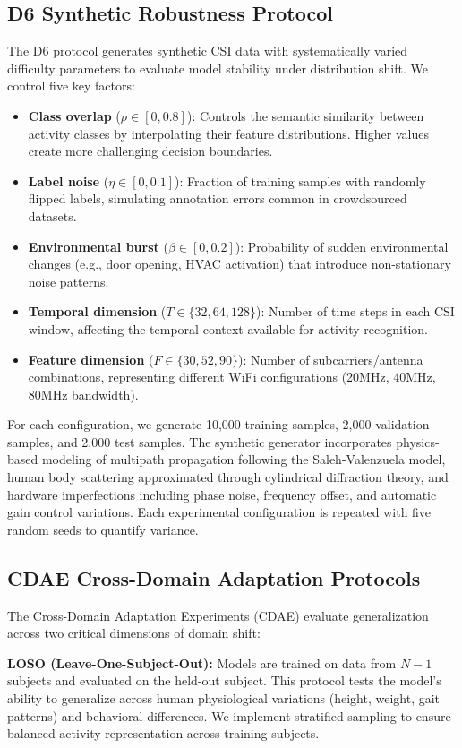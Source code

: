 \documentclass[journal]{IEEEtran}
\begin{document}
\subsection{D6 Synthetic Robustness Protocol}
The D6 protocol generates synthetic CSI data with systematically varied difficulty parameters to evaluate model stability under distribution shift. We control five key factors:
\begin{itemize}
\item \textbf{Class overlap} ($\rho \in [0, 0.8]$): Controls the semantic similarity between activity classes by interpolating their feature distributions. Higher values create more challenging decision boundaries.
\item \textbf{Label noise} ($\eta \in [0, 0.1]$): Fraction of training samples with randomly flipped labels, simulating annotation errors common in crowdsourced datasets.
\item \textbf{Environmental burst} ($\beta \in [0, 0.2]$): Probability of sudden environmental changes (e.g., door opening, HVAC activation) that introduce non-stationary noise patterns.
\item \textbf{Temporal dimension} ($T \in \{32, 64, 128\}$): Number of time steps in each CSI window, affecting the temporal context available for activity recognition.
\item \textbf{Feature dimension} ($F \in \{30, 52, 90\}$): Number of subcarriers/antenna combinations, representing different WiFi configurations (20MHz, 40MHz, 80MHz bandwidth).
\end{itemize}

For each configuration, we generate 10,000 training samples, 2,000 validation samples, and 2,000 test samples. The synthetic generator incorporates physics-based modeling of multipath propagation following the Saleh-Valenzuela model, human body scattering approximated through cylindrical diffraction theory, and hardware imperfections including phase noise, frequency offset, and automatic gain control variations. Each experimental configuration is repeated with five random seeds to quantify variance.

\subsection{CDAE Cross-Domain Adaptation Protocols}
The Cross-Domain Adaptation Experiments (CDAE) evaluate generalization across two critical dimensions of domain shift:

\textbf{LOSO (Leave-One-Subject-Out):} Models are trained on data from $N-1$ subjects and evaluated on the held-out subject. This protocol tests the model's ability to generalize across human physiological variations (height, weight, gait patterns) and behavioral differences. We implement stratified sampling to ensure balanced activity representation across training subjects.
\end{document}
